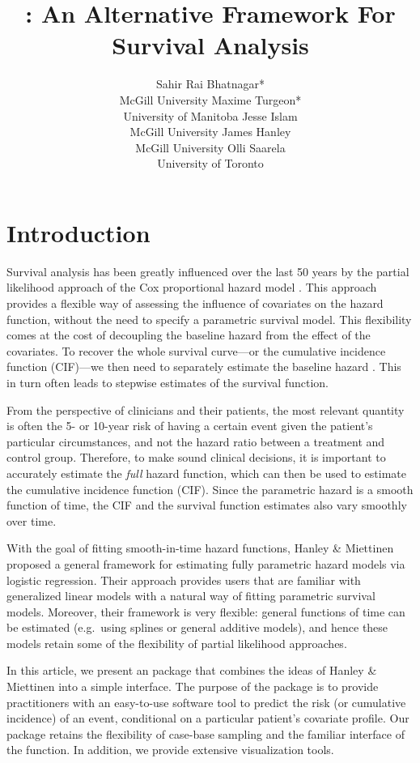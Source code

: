 \documentclass[
]{jss}
\author{
Sahir Rai Bhatnagar*\\McGill University \And Maxime Turgeon*\\University of Manitoba \AND Jesse Islam\\McGill University \And James Hanley\\McGill University \And Olli Saarela\\University of Toronto
}
\title{\pkg{casebase}: An Alternative Framework For Survival Analysis}
\begin{document}
\hypertarget{introduction}{%
\section{Introduction}\label{introduction}}

Survival analysis has been greatly influenced over the last 50 years by
the partial likelihood approach of the Cox proportional hazard model
\citep{cox1972regression}. This approach provides a flexible way of
assessing the influence of covariates on the hazard function, without
the need to specify a parametric survival model. This flexibility comes
at the cost of decoupling the baseline hazard from the effect of the
covariates. To recover the whole survival curve---or the cumulative
incidence function (CIF)---we then need to separately estimate the
baseline hazard \citep{breslow1972discussion}. This in turn often leads
to stepwise estimates of the survival function.

From the perspective of clinicians and their patients, the most relevant
quantity is often the 5- or 10-year risk of having a certain event given
the patient's particular circumstances, and not the hazard ratio between
a treatment and control group. Therefore, to make sound clinical
decisions, it is important to accurately estimate the \emph{full} hazard
function, which can then be used to estimate the cumulative incidence
function (CIF). Since the parametric hazard is a smooth function of
time, the CIF and the survival function estimates also vary smoothly
over time.

With the goal of fitting smooth-in-time hazard functions, Hanley \&
Miettinen \citeyearpar{hanley2009fitting} proposed a general framework
for estimating fully parametric hazard models via logistic regression.
Their approach provides users that are familiar with generalized linear
models with a natural way of fitting parametric survival models.
Moreover, their framework is very flexible: general functions of time
can be estimated (e.g.~using splines or general additive models), and
hence these models retain some of the flexibility of partial likelihood
approaches.

In this article, we present an  package that combines the
ideas of Hanley \& Miettinen into a simple interface. The purpose of the
 package is to provide practitioners with an easy-to-use
software tool to predict the risk (or cumulative incidence) of an event,
conditional on a particular patient's covariate profile. Our package
retains the flexibility of case-base sampling and the familiar interface
of the  function. In addition, we provide extensive
visualization tools.
\end{document}
